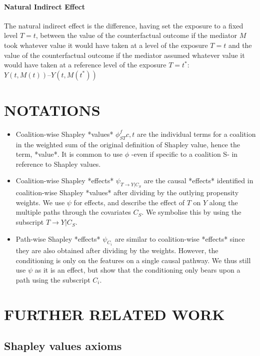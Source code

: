 \paragraph{Natural Indirect Effect}{The natural indirect effect is the difference, having set the exposure to a fixed level  $T = t$, between the value of the counterfactual outcome if the mediator $M$ took whatever value it would have taken at a level of the exposure $T = t$ and the value of the counterfactual outcome if the mediator assumed whatever value it would have taken at a reference level of the exposure $T = t^*$: $Y(t, M(t)) – Y(t, M(t^*))$ }


\section{NOTATIONS} \label{sec:notations}

\begin{itemize}
    \item Coalition-wise Shapley *values*  $\phi^{f}_{ST}{c,t}$ are the individual terms for a coalition in the weighted sum of the original definition of Shapley value, hence the term, *value*. It is common to use $\phi$ -even if specific to a coalition S- in reference to Shapley values. 
    \item Coalition-wise Shapley *effects* $\psi_{T \rightarrow Y | C_{S}}$ are the causal *effects* identified in  coalition-wise Shapley *values* after dividing by the outlying propensity weights. We use $\psi$ for effects, and describe the effect of $T$ on $Y$ along the multiple paths through the covariates $C_S$. We symbolise this by using the subscript $T \rightarrow Y | C_{S}$.
    \item Path-wise Shapley *effects* $\psi_{C_i}$ are similar to coalition-wise *effects* since they are also obtained after dividing by the weights. However, the conditioning is only on the features on a single causal pathway. We thus still use $\psi$ as it is an effect, but show that the conditioning only bears upon a path using the subscript $C_i$.
\end{itemize}

\section{FURTHER RELATED WORK} \label{sec:further}

\subsection{Shapley values axioms} \label{subsec:shap_axioms}

